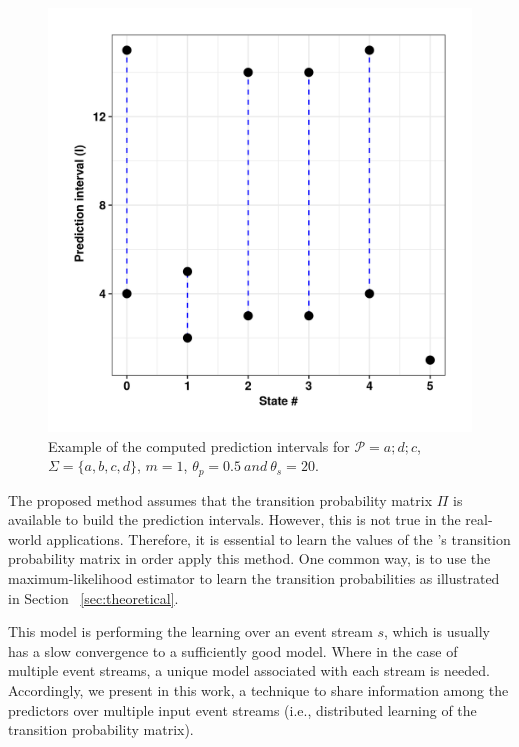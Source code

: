 \begin{figure}[H]
	\begin{centering}
		\center
			\includegraphics[width=\textwidth,keepaspectratio]{chapters/figures/new_prediction_intervals.png}
					
		\caption{Example of the computed prediction intervals for
			$\mathcal{P}=a ; d ; c$, $\Sigma=\{a,b,c,d\}$, $m=1$, $\theta_{p}=0.5\ and\ \theta_{s}=20$.}
		\label{fig:predictionsIntervals}
	\end{centering}
\end{figure}

\par The proposed method assumes that the transition probability matrix $\Pi$ is available to build the prediction intervals. However, this is not true in the real-world applications.
Therefore, it is essential to learn the values of the \pmcmr's transition probability matrix in order apply this method. One common way, is to use the maximum-likelihood estimator to learn the transition probabilities as illustrated in Section ~\ref{sec:theoretical}. 

\par This model is performing the learning over an event stream $s$, which is usually has a slow convergence to a sufficiently good model. Where in the case of multiple event streams, a unique model associated with each stream is needed. Accordingly, we present in this work, a technique to share information among the \pmcmr predictors over multiple input event streams (i.e., distributed learning of the transition probability matrix).

